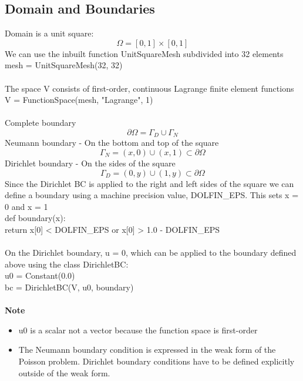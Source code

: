 \documentclass[12pt,3p]{article}
\begin{document}
\subsection{Domain and Boundaries}
Domain is a unit square: 
\[ \Omega = [0,1] \times [0,1] \] 
We can use the inbuilt function {\selectfont UnitSquareMesh} subdivided into 32 elements  \\
{\selectfont
mesh = UnitSquareMesh(32, 32) \\ \\
}
The space {\selectfont V} consists of first-order, continuous Lagrange finite element functions \\ 
{\selectfont
V = FunctionSpace(mesh, "Lagrange", 1) \\ \\
}
Complete boundary 
\[ \partial \Omega = \Gamma_D \cup \Gamma_N \]
Neumann boundary - On the bottom and top of the square
\[ \Gamma_N =  {(x,0) \cup (x,1) \subset \partial \Omega } \]
Dirichlet boundary - On the sides of the square
\[ \Gamma_D = {(0,y) \cup (1,y) \subset \partial \Omega } \]
Since the Dirichlet BC is applied to the right and left sides of the square we can define a boundary using a machine precision value, {\selectfont DOLFIN\_EPS}. This sets x = 0 and x = 1  \\
{\selectfont
def boundary(x): \\
\indent \indent return x[0] < DOLFIN\_EPS or x[0] > 1.0 - DOLFIN\_EPS \\ \\
}
On the Dirichlet boundary, u = 0, which can be applied to the boundary defined above using the class {\selectfont DirichletBC}: \\
{\selectfont
u0 = Constant(0.0) \\
bc = DirichletBC(V, u0, boundary) \\ \\
}
\textbf{Note}
\begin{itemize}
\item {\selectfont u0} is a scalar not a vector because the function space is first-order
\item The Neumann boundary condition is expressed in the weak form of the Poisson problem. Dirichlet boundary conditions have to be defined explicitly outside of the weak form. 
\end{itemize}
\end{document}
